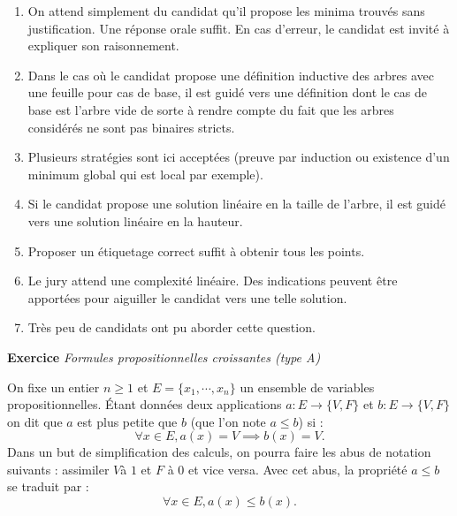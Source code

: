 \documentclass[a4paper, 11pt]{article}
\newcounter{exocntr}
\newcommand{\exocommand}[1]{\stepcounter{exocntr} \textbf{Exercice \arabic{exocntr}} \textit{#1}}
\begin{document}
\begin{enumerate}
\item On attend simplement du candidat qu'il propose les minima trouvés sans justification. Une réponse orale suffit. En cas d'erreur, le candidat est invité à expliquer son raisonnement.
\item Dans le cas où le candidat propose une définition inductive des arbres avec une feuille pour cas de base, il est guidé vers une définition dont le cas de base est l'arbre vide de sorte à rendre compte du fait que les arbres considérés ne sont pas binaires stricts.
\item Plusieurs stratégies sont ici acceptées (preuve par induction ou existence d'un minimum global qui est local par exemple).
\item Si le candidat propose une solution linéaire en la taille de l'arbre, il est guidé vers une solution linéaire en la hauteur.
\item Proposer un étiquetage correct suffit à obtenir tous les points.
\item Le jury attend une complexité linéaire. Des indications peuvent être apportées pour aiguiller le candidat vers une telle solution.
\item Très peu de candidats ont pu aborder cette question.
\end{enumerate}

\newpage

\exocommand{Formules propositionnelles croissantes (type A)}

On fixe un entier $n \ge 1$ et $E= \{x_1, \cdots , x_n\}$ un ensemble de variables propositionnelles. \'Etant données deux applications  $a:E \to \{ V , F\}$ et $b:E\to \{V,F\}$ on dit que  $a$ est plus petite que
$b$ (que l'on note  $a\leq b$) si :
 \begin{equation*}
    \forall x\in E, a(x)=V \implies b(x)= V.
\end{equation*}
 Dans un but de simplification des calculs,  on pourra faire les abus de notation suivants : assimiler $V$à $1$ et  $F$ à  $0$ et vice versa. Avec cet abus, la propriété  $a\leq b$ se traduit par :
 \begin{equation*}
    \forall x \in E, a(x)\leq b(x).
\end{equation*}
\end{document}
